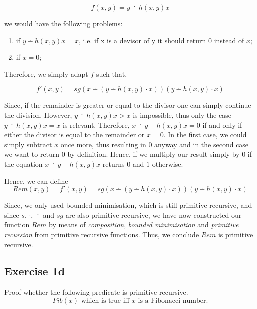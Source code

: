 \documentclass[11pt,a4paper]{article}
\begin{document}
\begin{equation*}
f(x,y) = y \dotminus h(x,y)x
\end{equation*}
 
 we would have the following problems:
 
\begin{enumerate}
\item if $y \dotminus h(x,y)x=x$, i.e. if x is a devisor of y it should return $0$ instead of $x$;
\item if $x=0$;
\end{enumerate}

Therefore, we simply adapt $f$ such that,
 
\begin{equation*}
f'(x,y) = sg(x \dotminus(y\dotminus h(x,y)\cdot x))(y \dotminus h(x,y)\cdot x) 
\end{equation*}

Since, if the remainder is greater or equal to the divisor one can simply continue the division. However,
$y \dotminus h(x,y)x > x$ is impossible, thus only the case $y \dotminus h(x,y)x = x$ is relevant. Therefore,  
$x \dotminus y-h(x,y)x = 0$ if and only if either the divisor is equal to the remainder or $x=0$.
In the first case, we could simply subtract $x$ once more, thus resulting in $0$ anyway and in the second case 
we want to return $0$ by definition. Hence, if we multiply our result simply by $0$ if the equation 
$x \dotminus y-h(x,y)x$ returns $0$ and $1$ otherwise.

Hence, we can define 
\begin{equation*}
Rem(x,y)=f'(x,y) = sg(x \dotminus (y \dotminus h(x,y) \cdot x))(y \dotminus h(x,y) \cdot x) 
\end{equation*}

Since, we only used bounded minimisation, which is still primitive recursive, and since  $s$, $\cdot$, $\dotminus$ and $sg$ are also primitive recursive,
we have now constructed our function $Rem$ by means of \emph{composition}, \emph{bounded minimisation} and \emph{primitive recursion} from primitive recursive functions.
Thus, we conclude $Rem$ is primitive recursive.



\subsection*{Exercise 1d}
Proof whether the following predicate is primitive recursive.
\begin{equation*}
Fib(x) \text{ which is true iff } x \text{ is a Fibonacci number.}
\end{equation*}
\end{document}
